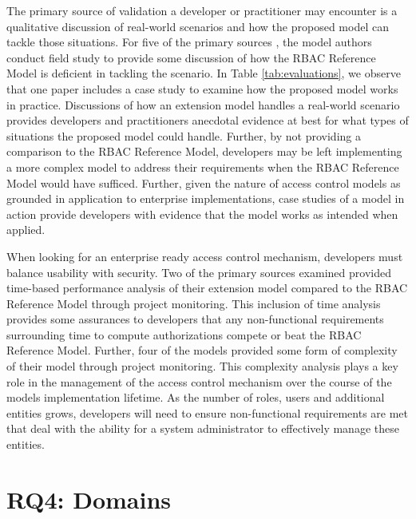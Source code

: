 The primary source of validation a developer or practitioner may encounter is a qualitative discussion of real-world
scenarios and how the proposed model can tackle those situations. 
For five of the primary sources \cite{bao08:role} \cite{zou2009crbac} \cite{zhang06:collaborative} \cite{ray07:spatio} \cite{zhao2008flexible}, the model authors conduct field study to provide some discussion of how the RBAC Reference Model is deficient in tackling the scenario.
In Table \ref{tab:evaluations}, we observe that one paper includes a case study to examine how the proposed model works in practice. Discussions
of how an extension model handles a real-world scenario provides developers and practitioners anecdotal evidence at best
for what types of situations the proposed model could handle. Further, by not providing a comparison to the RBAC Reference Model, developers may be left implementing a more complex model to address their requirements when the RBAC Reference Model would
have sufficed.  Further, given the nature of access control models as grounded in application to enterprise implementations, 
case studies of a model in action provide developers with evidence that the model works as intended when applied.

When looking for an enterprise ready access control mechanism, developers must balance usability with security. 
Two of the primary sources examined provided time-based performance analysis of their extension model compared
to the RBAC Reference Model through project monitoring. This inclusion of time analysis provides some assurances to developers that any non-functional
requirements surrounding time to compute authorizations compete or beat the RBAC Reference Model. Further, four of the models provided
some form of complexity of their model through project monitoring. This complexity analysis plays a key role in the management of the access control mechanism
over the course of the models implementation lifetime. As the number of roles, users and additional entities grows, developers will 
need to ensure non-functional requirements are met that deal with the ability for a system administrator to effectively manage these
entities.



\section{RQ4: Domains} \label{sec:domains}

